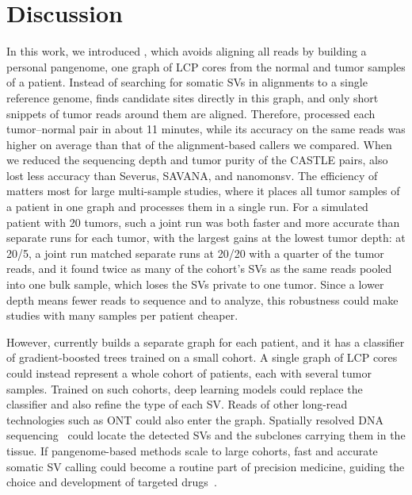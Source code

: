 \section{Discussion}\label{sec:discussion}
In this work, we introduced \tool{}, which avoids aligning all reads by building a personal pangenome, one graph of LCP cores from the normal and tumor samples of a patient.
Instead of searching for somatic SVs in alignments to a single reference genome, \tool{} finds candidate sites directly in this graph, and only short snippets of tumor reads around them are aligned.
Therefore, \tool{} processed each tumor--normal pair in about 11 minutes, while its accuracy on the same reads was higher on average than that of the alignment-based callers we compared.
When we reduced the sequencing depth and tumor purity of the CASTLE pairs, \tool{} also lost less accuracy than Severus, SAVANA, and nanomonsv.
The efficiency of \tool{} matters most for large multi-sample studies, where it places all tumor samples of a patient in one graph and processes them in a single run.
For a simulated patient with 20 tumors, such a joint run was both faster and more accurate than separate runs for each tumor, with the largest gains at the lowest tumor depth: at 20/5, a joint run matched separate runs at 20/20 with a quarter of the tumor reads, and it found twice as many of the cohort's SVs as the same reads pooled into one bulk sample, which loses the SVs private to one tumor.
Since a lower depth means fewer reads to sequence and to analyze, this robustness could make studies with many samples per patient cheaper.

However, \tool{} currently builds a separate graph for each patient, and it has a classifier of gradient-boosted trees trained on a small cohort.
A single graph of LCP cores could instead represent a whole cohort of patients, each with several tumor samples.
Trained on such cohorts, deep learning models could replace the classifier and also refine the type of each SV.
Reads of other long-read technologies such as ONT could also enter the graph.
Spatially resolved DNA sequencing~\cite{slidedna} could locate the detected SVs and the subclones carrying them in the tissue.
If pangenome-based methods scale to large cohorts, fast and accurate somatic SV calling could become a routine part of precision medicine, guiding the choice and development of targeted drugs~\cite{schram2017}.


